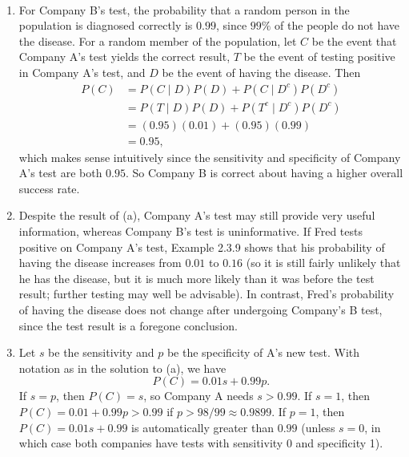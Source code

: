 

\setcounter{theorem}{12}
\begin{exercise}[BH.2.13]
	\begin{solution}~
		\begin{enumerate}
			\item For Company B's test, the probability that a random person in the population is diagnosed correctly is $0.99$, since $99 \%$ of the people do not have the disease. For a random member of the population, let $C$ be the event that Company A's test yields the correct result, $T$ be the event of testing positive in Company A's test, and $D$ be the event of having the disease. Then
			$$
			\begin{aligned}
				P(C) &=P(C \mid D) P(D)+P\left(C \mid D^c\right) P\left(D^c\right) \\
				&=P(T \mid D) P(D)+P\left(T^c \mid D^c\right) P\left(D^c\right) \\
				&=(0.95)(0.01)+(0.95)(0.99) \\
				&=0.95,
			\end{aligned}
			$$
			which makes sense intuitively since the sensitivity and specificity of Company A's test are both $0.95$. So Company B is correct about having a higher overall success rate.
			\item  Despite the result of (a), Company A's test may still provide very useful information, whereas Company B's test is uninformative. If Fred tests positive on Company A's test, Example 2.3.9 shows that his probability of having the disease increases from $0.01$ to $0.16$ (so it is still fairly unlikely that he has the disease, but it is much more likely than it was before the test result; further testing may well be advisable). In contrast, Fred's probability of having the disease does not change after undergoing Company's B test, since the test result is a foregone conclusion.
			\item Let $s$ be the sensitivity and $p$ be the specificity of A's new test. With notation as in the solution to (a), we have
			$$
			P(C)=0.01 s+0.99 p .
			$$
			If $s=p$, then $P(C)=s$, so Company A needs $s>0.99$.
			If $s=1$, then $P(C)=0.01+0.99 p>0.99$ if $p>98 / 99 \approx 0.9899$.
			If $p=1$, then $P(C)=0.01 s+0.99$ is automatically greater than $0.99$ (unless $s=0$, in which case both companies have tests with sensitivity 0 and specificity 1).
		\end{enumerate}
	\end{solution}
\end{exercise}


